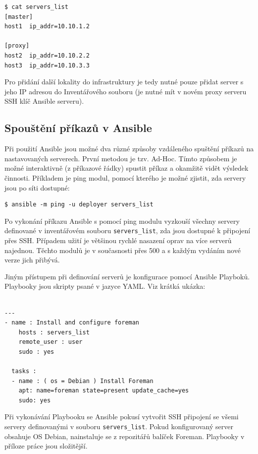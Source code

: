 \documentclass[thesis=B,czech]{FITthesis}[2012/06/26]
\begin{document}
\begin{verbatim}
$ cat servers_list
[master]
host1  ip_addr=10.10.1.2

[proxy]
host2  ip_addr=10.10.2.2
host3  ip_addr=10.10.3.3
\end{verbatim}

Pro přidání další lokality do infrastruktury je tedy nutné pouze přidat server s jeho IP adresou do Inventářového souboru (je nutné mít v novém proxy serveru SSH klíč Ansible serveru).

\subsection{Spouštění příkazů v Ansible}

Při použití Ansible jsou možné dva různé způsoby vzdáleného spuštění příkazů na nastavovaných serverech. První metodou je tzv. Ad-Hoc. Tímto způsobem je možné interaktivně (z příkazové řádky) spustit příkaz a okamžitě vidět výsledek činnosti. Příkladem je ping modul, pomocí kterého je možné zjistit, zda servery jsou po síti dostupné:

\begin{verbatim}
$ ansible -m ping -u deployer servers_list
\end{verbatim}

Po vykonání příkazu Ansible s pomocí ping modulu vyzkouší všechny servery definované v inventářovém souboru \texttt{servers_list}, zda jsou dostupné k připojení přes SSH. Případem užití je většinou rychlé nasazení oprav na více serverů najednou. Těchto modulů je v současnosti přes 500 \cite{ansible-num-modules} a s každým vydáním nové verze jich přibývá. 

Jiným přístupem při definování serverů je konfigurace pomocí Ansible Playboků. Playbooky jsou skripty psané v jazyce YAML. Viz krátká ukázka:
\begin{verbatim}

---
- name : Install and configure foreman
    hosts : servers_list
    remote_user : user
    sudo : yes

  tasks :
  - name : ( os = Debian ) Install Foreman
    apt: name=foreman state=present update_cache=yes
    sudo: yes

\end{verbatim}


Při vykonávání Playbooku se Ansible pokusí vytvořit SSH připojení se všemi servery definovanými v souboru \texttt{servers_list}. Pokud konfigurovaný server obsahuje OS Debian, nainstaluje se z repozitářů balíček Foreman. Playbooky v příloze práce jsou složitější.
\end{document}
